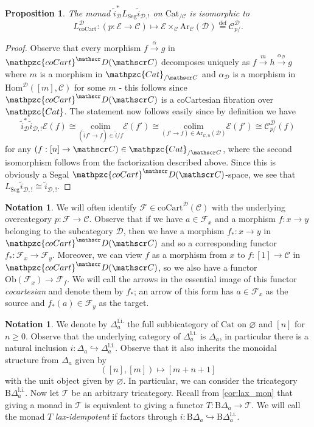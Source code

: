 \documentclass[a4paper, reqno]{amsart}
\newtheorem{prop}[theorem]{Proposition}
\theoremstyle{definition}
\newtheorem{notation}[theorem]{Notation}
\newcommand\cC{\mathscr C}
\newcommand\cD{\mathscr D}
\newcommand\cE{\mathscr E}
\newcommand\cF{\mathscr F}
\newcommand\cT{\mathscr T}
\newcommand\rB{\mathrm B}
\newcommand\mor{\mathrm{Hom}}
\newcommand\cat{\mathrm{Cat}}
\newcommand\ccat{\mathpzc{Cat}}
\newcommand\arr{\mathrm{Ar}}
\newcommand\colim{\mathrm{colim}}
\newcommand\bydef{\overset{\mathrm{def}}{=}}
\newcommand\li{\mathrm{l.i.}}
\newcommand\cart{\mathrm{coCart}}
\newcommand\ccart{\mathpzc{coCart}}
\newcommand\ob{\mathrm{Ob}}
\newcommand\seg{\mathrm{Seg}}
\begin{document}
\begin{prop}\label{prop:cart_mon}
The monad $\widetilde{i}^*_\cD L_\seg \widetilde{i}_{\cD,!}$ on $\cat_{/\cC}$ is isomorphic to 
\[L_\cart^\cD:(p:\cE\rightarrow\cC)\mapsto\cE\times_{\cC}\arr_\cC(\cD)\bydef\cC^\cD_{p/}.\]
\end{prop}
\begin{proof}
Observe that every morphism $f\xrightarrow{\alpha}g$ in $\ccart^\cD(\cC)$ decomposes uniquely as $f\xrightarrow{m}h\xrightarrow{\alpha_\cD}g$ where $m$ is a morphism in $\ccat_{/\cC}$ and $\alpha_\cD$ is a morphism in $\mor^\cD([m],\cC)$ for some $m$ - this follows since $\ccart^\cD(\cC)$ is a coCartesian fibration over $\ccat$. The statement now follows easily since by definition we have 
\[\widetilde{i}^*_\cD\widetilde{i}_{\cD,!}\cE(f)\cong\underset{(\widetilde{i}f'\rightarrow f)\in\widetilde{i}/f}{\colim}\cE(f')\cong \underset{(f'\rightarrow f)\in\arr_{\cC,n}(\cD)}{\colim}\cE(f')\cong\cC^\cD_{p/}(f)\]
for any $(f:[n]\rightarrow\cC)\in\ccat_{/\cC}$, where the second isomorphism follows from the factorization described above. Since this is obviously a Segal $\ccart^\cD(\cC)$-space, we see that $L_\seg \widetilde{i}_{\cD,!}\cong \widetilde{i}_{\cD,!}$.
\end{proof}
\begin{notation}\label{not:cartmor}
We will often identify $\cF\in\cart^\cD(\cC)$ with the underlying overcategory $p:\cF\rightarrow\cC$. Observe that if we have $a\in\cF_x$ and a morphism $f:x\rightarrow y$ belonging to the subcategory $\cD$, then we have a morphism $f_*:x\rightarrow y$ in $\ccart^\cD(\cC)$ and so a corresponding functor $f_*:\cF_x\rightarrow\cF_y$. Moreover, we can view $f$ as a morphism from $x$ to $f:[1]\rightarrow\cC$ in $\ccart^\cD(\cC)$, so we also have a functor $\ob(\cF_x)\rightarrow\cF_f$. We will call the arrows in the essential image of this functor \textit{cocartesian} and denote them by $f_*$; an arrow of this form has $a\in\cF_x$ as the source and $f_*(a)\in\cF_y$ as the target.
\end{notation}
\begin{notation}
We denote by $\Delta^\li_a$ the full subbicategory of $\cat$ on $\varnothing$ and $[n]$ for $n\geq0$. Observe that the underlying category of $\Delta^\li_a$ is $\Delta_a$, in particular there is a natural inclusion $i:\Delta_a\hookrightarrow\Delta^\li_a$. Observe that it also inherits the monoidal structure from $\Delta_a$ given by 
\[([n],[m])\mapsto[m+n+1]\]
with the unit object given by $\varnothing$. In particular, we can consider the tricategory $\rB \Delta^\li_a$. Now let $\cT$ be an arbitrary tricategory. Recall from \cref{cor:lax_mon} that giving a monad in $\cT$ is equivalent to giving a functor $T:\rB\Delta_a\rightarrow\cT$. We will call the monad $T$ \textit{lax-idempotent} if factors through $i:\rB\Delta_a\hookrightarrow\rB\Delta^\li_a$.
\end{notation}
\end{document}
